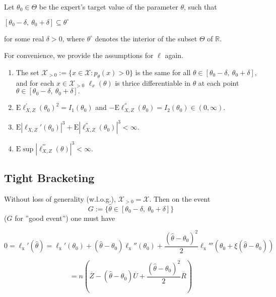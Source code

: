 Let $\theta_{0}\in \Theta$ be the expert's target value of the parameter $\theta$, such that
\begin{center}
	$[\theta_{0}-\delta,\ \theta_{0}+\delta]\subseteq \theta^{\circ}$ 
\end{center}
for some real $\delta>0$, where $\theta^{\circ}$ denotes the interior of the subset $\Theta$ of $\mathbb{R}$.

For convenience, we provide the assumptions for $\ell$ again.

\begin{enumerate}
	\item The set $\mathcal{X}_{>0} :=\{x\in \mathcal{X}:p_{\theta}(x)>0\}$ is the same for all $\theta\in [\theta_{0}-\delta,\ \theta_{0}+\delta],$ and for each $x\in \mathcal{X}_{>0}$ $\ell_{x}(\theta)$ is thrice differentiable in $\theta$ at each point $\theta\in [\theta_{0}-\delta,\ \theta_{0}+\delta].$
	\item $\mathrm{E}\ell_{X,Z}^{'}(\theta_{0})^{2}=I_1(\theta_0)$ and $-\mathrm{E}\ell_{X,Z}^{''}(\theta_{0})=I_2(\theta_{0})\in (0,\infty)$.
	\item $\mathrm{E}|\ell_{X,Z}'(\theta_{0})|^{3}+\mathrm{E}|\ell_{X,Z}^{''}(\theta_{0})|^{3}<\infty.$
	\item $\mathrm{E} \sup |\ell_{X,Z}^{'''}(\theta)|^{3}<\infty.$
\end{enumerate}

\medskip

\subsection*{Tight Bracketing}

Without loss of generality (w.l.o.g.), $\mathcal{X}_{>0}=\mathcal{X}$. Then on the event
\begin{equation}\label{eqn:goodevent}
G:=\{\hat{\theta}\in[\theta_{0}-\delta,\ \theta_{0}+\delta]\}
\end{equation}
($G$ for ''good event'') one must have

\begin{equation}\label{eqn:taylor}
0 =\ell_{\mathrm{x}}'(\displaystyle \hat{\theta})=\ell_{\mathrm{x}}'(\theta_{0})+(\hat{\theta}-\theta_{0})\ell_{\mathrm{x}}''(\theta_{0})+\frac{(\hat{\theta}-\theta_{0})^{2}}{2}\ell_{\mathrm{x}}'''(\theta_{0}+\xi(\hat{\theta}-\theta_{0}))
\end{equation}

\begin{equation}\label{eqn:taylor2}
=n(\overline{Z}-(\hat{\theta}-\theta_{0})\overline{U}+\frac{(\hat{\theta}-\theta_{0})^{2}}{2}\overline{R})
\end{equation}

